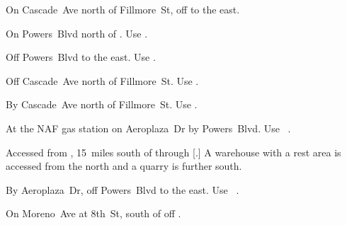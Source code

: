 
\begin{LocationList}

On Cascade~Ave north of Fillmore~St, off   to the east.

On  Powers~Blvd north of .
Use  .

Off  Powers~Blvd to the east.
Use  .

\Location{\GarageHQ \Garage}
Off Cascade~Ave north of Fillmore~St.
Use  .

By Cascade~Ave north of Fillmore~St.
Use  .

At the NAF gas station on Aeroplaza~Dr by  Powers~Blvd.
Use~ .

Accessed from , 15~miles south of  through [.]
A warehouse with a rest area is accessed from the north and a quarry is further south.

By Aeroplaza~Dr, off  Powers~Blvd to the east.
Use~ .

On Moreno~Ave at 8th~St, south of  off  .

\end{LocationList}
